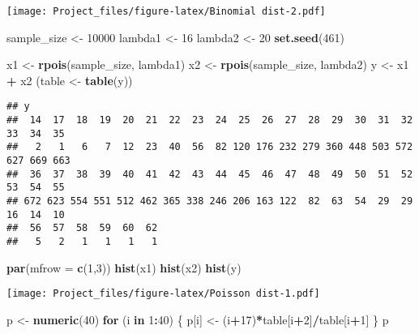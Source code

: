 \documentclass[
]{article}
\newenvironment{Shaded}{\begin{snugshade}}{\end{snugshade}}
\newcommand{\AttributeTok}[1]{\textcolor[rgb]{0.13,0.29,0.53}{#1}}
\newcommand{\ControlFlowTok}[1]{\textcolor[rgb]{0.13,0.29,0.53}{\textbf{#1}}}
\newcommand{\DecValTok}[1]{\textcolor[rgb]{0.00,0.00,0.81}{#1}}
\newcommand{\FunctionTok}[1]{\textcolor[rgb]{0.13,0.29,0.53}{\textbf{#1}}}
\newcommand{\NormalTok}[1]{#1}
\newcommand{\OtherTok}[1]{\textcolor[rgb]{0.56,0.35,0.01}{#1}}
\newcommand{\SpecialCharTok}[1]{\textcolor[rgb]{0.81,0.36,0.00}{\textbf{#1}}}
\begin{document}
\texttt{[image: Project\_files/figure-latex/Binomial dist-2.pdf]}

\begin{Shaded}
\begin{Highlighting}[]
\NormalTok{sample\_size }\OtherTok{\textless{}{-}} \DecValTok{10000}
\NormalTok{lambda1 }\OtherTok{\textless{}{-}} \DecValTok{16}
\NormalTok{lambda2 }\OtherTok{\textless{}{-}} \DecValTok{20}
\FunctionTok{set.seed}\NormalTok{(}\DecValTok{461}\NormalTok{)}

\NormalTok{x1 }\OtherTok{\textless{}{-}} \FunctionTok{rpois}\NormalTok{(sample\_size, lambda1)}
\NormalTok{x2 }\OtherTok{\textless{}{-}} \FunctionTok{rpois}\NormalTok{(sample\_size, lambda2)}
\NormalTok{y }\OtherTok{\textless{}{-}}\NormalTok{ x1 }\SpecialCharTok{+}\NormalTok{ x2}
\NormalTok{(table }\OtherTok{\textless{}{-}} \FunctionTok{table}\NormalTok{(y))}
\end{Highlighting}
\end{Shaded}

\begin{verbatim}
## y
##  14  17  18  19  20  21  22  23  24  25  26  27  28  29  30  31  32  33  34  35 
##   2   1   6   7  12  23  40  56  82 120 176 232 279 360 448 503 572 627 669 663 
##  36  37  38  39  40  41  42  43  44  45  46  47  48  49  50  51  52  53  54  55 
## 672 623 554 551 512 462 365 338 246 206 163 122  82  63  54  29  29  16  14  10 
##  56  57  58  59  60  62 
##   5   2   1   1   1   1
\end{verbatim}

\begin{Shaded}
\begin{Highlighting}[]
\FunctionTok{par}\NormalTok{(}\AttributeTok{mfrow =} \FunctionTok{c}\NormalTok{(}\DecValTok{1}\NormalTok{,}\DecValTok{3}\NormalTok{))}
\FunctionTok{hist}\NormalTok{(x1)}
\FunctionTok{hist}\NormalTok{(x2)}
\FunctionTok{hist}\NormalTok{(y)}
\end{Highlighting}
\end{Shaded}

\texttt{[image: Project\_files/figure-latex/Poisson dist-1.pdf]}

\begin{Shaded}
\begin{Highlighting}[]
\NormalTok{p }\OtherTok{\textless{}{-}} \FunctionTok{numeric}\NormalTok{(}\DecValTok{40}\NormalTok{)}
\ControlFlowTok{for}\NormalTok{ (i }\ControlFlowTok{in} \DecValTok{1}\SpecialCharTok{:}\DecValTok{40}\NormalTok{) \{}
\NormalTok{  p[i] }\OtherTok{\textless{}{-}}\NormalTok{ (i}\SpecialCharTok{+}\DecValTok{17}\NormalTok{)}\SpecialCharTok{*}\NormalTok{table[i}\SpecialCharTok{+}\DecValTok{2}\NormalTok{]}\SpecialCharTok{/}\NormalTok{table[i}\SpecialCharTok{+}\DecValTok{1}\NormalTok{]}
\NormalTok{\}}
\NormalTok{p}
\end{Highlighting}
\end{Shaded}
\end{document}
